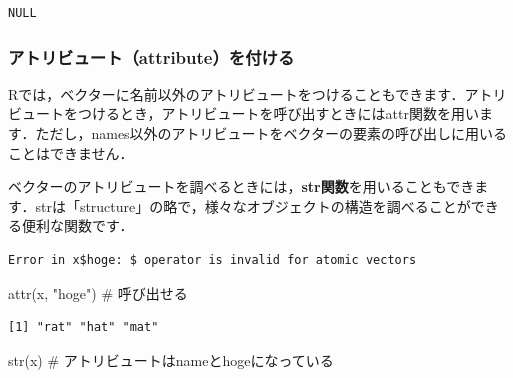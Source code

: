 \documentclass[
  letterpaper,
  DIV=11,
  numbers=noendperiod]{scrreprt}
\newenvironment{Shaded}{\begin{snugshade}}{\end{snugshade}}
\newcommand{\CommentTok}[1]{\textcolor[rgb]{0.37,0.37,0.37}{#1}}
\newcommand{\FunctionTok}[1]{\textcolor[rgb]{0.28,0.35,0.67}{#1}}
\newcommand{\NormalTok}[1]{\textcolor[rgb]{0.00,0.23,0.31}{#1}}
\newcommand{\OtherTok}[1]{\textcolor[rgb]{0.00,0.23,0.31}{#1}}
\newcommand{\SpecialCharTok}[1]{\textcolor[rgb]{0.37,0.37,0.37}{#1}}
\newcommand{\StringTok}[1]{\textcolor[rgb]{0.13,0.47,0.30}{#1}}
\begin{document}
\begin{verbatim}
NULL
\end{verbatim}

\hypertarget{ux30a2ux30c8ux30eaux30d3ux30e5ux30fcux30c8attributeux3092ux4ed8ux3051ux308b}{%
\subsubsection{アトリビュート（attribute）を付ける}\label{ux30a2ux30c8ux30eaux30d3ux30e5ux30fcux30c8attributeux3092ux4ed8ux3051ux308b}}

Rでは，ベクターに名前以外のアトリビュートをつけることもできます．アトリビュートをつけるとき，アトリビュートを呼び出すときにはattr関数を用います．ただし，names以外のアトリビュートをベクターの要素の呼び出しに用いることはできません．

ベクターのアトリビュートを調べるときには，\textbf{str関数}を用いることもできます．strは「structure」の略で，様々なオブジェクトの構造を調べることができる便利な関数です．

\begin{Shaded}
\end{Shaded}

\begin{verbatim}
Error in x$hoge: $ operator is invalid for atomic vectors
\end{verbatim}

\begin{Shaded}
\begin{Highlighting}[]
\FunctionTok{attr}\NormalTok{(x, }\StringTok{"hoge"}\NormalTok{) }\CommentTok{\# 呼び出せる}
\end{Highlighting}
\end{Shaded}

\begin{verbatim}
[1] "rat" "hat" "mat"
\end{verbatim}

\begin{Shaded}
\begin{Highlighting}[]
\FunctionTok{str}\NormalTok{(x) }\CommentTok{\# アトリビュートはnameとhogeになっている}
\end{Highlighting}
\end{Shaded}
\end{document}
